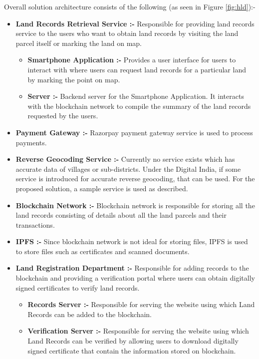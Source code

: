 \documentclass{article}
\begin{document}
    Overall solution architecture consists of the following (as seen in Figure \ref{fig:hld}):-
    \begin{itemize}
        \item \textbf{Land Records Retrieval Service :-} Responsible for providing land records service to the users who want to obtain land records by visiting the land parcel itself or marking the land on map.
        \begin{itemize}
            \item \textbf{Smartphone Application :-} Provides a user interface for users to interact with where users can request land records for a particular land by marking the point on map.
            \item \textbf{Server :-} Backend server for the Smartphone Application. It interacts with the blockchain network to compile the summary of the land records requested by the users.
        \end{itemize}
        \item \textbf{Payment Gateway :-} Razorpay payment gateway service is used to process payments.
        \item \textbf{Reverse Geocoding Service :-} Currently no service exists which has accurate data of villages or sub-districts. Under the Digital India, if some service is introduced for accurate reverse geocoding, that can be used. For the proposed solution, a sample service is used as described.
        \item \textbf{Blockchain Network :-} Blockchain network is responsible for storing all the land records consisting of details about all the land parcels and their transactions.
        \item \textbf{IPFS :-} Since blockchain network is not ideal for storing files, IPFS is used to store files such as certificates and scanned documents.
        \item \textbf{Land Registration Department :-} Responsible for adding records to the blockchain and providing a verification portal where users can obtain digitally signed certificates to verify land records.
        \begin{itemize}
            \item \textbf{Records Server :-} Responsible for serving the website using which Land Records can be added to the blockchain.
            \item \textbf{Verification Server :-} Responsible for serving the website using which Land Records can be verified by allowing users to download digitally signed certificate that contain the information stored on blockchain.
        \end{itemize}  
    \end{itemize}
\end{document}

